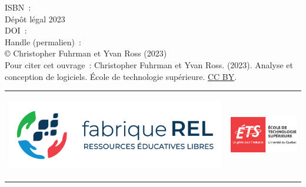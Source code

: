 

ISBN~: \\
Dépôt légal 2023 \\
DOI~: \\
Handle (permalien)~: \\
© Christopher Fuhrman et Yvan Ross (2023)\\
Pour citer cet ouvrage~: Christopher Fuhrman et Yvan Ross. (2023). Analyse et conception de logiciels.
École de technologie supérieure. \href{https://creativecommons.org/licenses/by/4.0/deed.fr}{CC BY}.


\vfill
\begin{tabular}{m{3.5in}m{3.5in}}
\includegraphics[height=1.5in]{images/F-REL_logo-coul-horiz.png} &
\includegraphics[width=1.5in]{images/Logo_ETS_TypoGrise_D_FR.eps}\\
\end{tabular}

